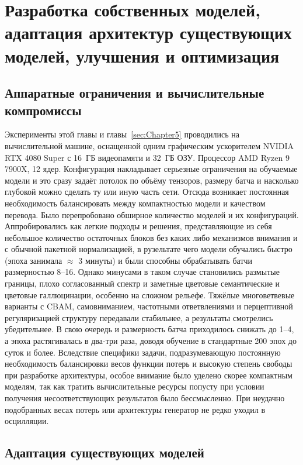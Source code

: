 \chapter{Разработка собственных моделей, адаптация архитектур существующих моделей, улучшения и оптимизация}
\label{sec:Chapter4} 

\section{Аппаратные ограничения и вычислительные компромиссы}
\label{subsec:hardware_constraints}

Эксперименты этой главы и главы~\ref{sec:Chapter5} проводились на вычислительной машине, оснащенной одним графическим ускорителем NVIDIA RTX 4080 Super с 16~ГБ видеопамяти и 32~ГБ ОЗУ.
Процессор AMD Ryzen 9 7900X, 12 ядер.
Конфигурация накладывает серьезные ограничения на обучаемые модели и это сразу задаёт потолок по объёму тензоров, размеру батча и насколько глубокой можно сделать ту или иную часть сети.
Отсюда возникает постоянная необходимость балансировать между компактностью модели и качеством перевода.
Было перепробовано обширное количество моделей и их конфигураций.
Аппробировались как легкие подходы и решения, представляющие из себя небольшое количество остаточных блоков без каких либо механизмов внимания и с обычной пакетной нормализацией, в рузельтате чего модели обучались быстро (эпоха занимала $\approx$ 3 минуты) и были способны обрабатывать батчи размерностью 8--16.
Однако минусами в таком случае становились размытые границы, плохо согласованный спектр и заметные цветовые семантические и цветовые галлюцинации, особенно на сложном рельефе.
Тяжёлые многоветвевые варианты с CBAM, самовниманием, частотными ответвлениями и перцептивной регуляризацией структуру передавали стабильнее, а результаты смотрелись убедительнее.
В свою очередь и размерность батча приходилось снижать до 1--4, а эпоха растягивалась в два-три раза, доводя обучение в стандартные 200 эпох до суток и более.
Вследствие специфики задачи, подразумевающую постоянную необходимость балансировки весов функции потерь и высокую степень свободы при разработке архитектуры, особое внимание было уделено скорее компактным моделям, так как тратить вычислительные ресурсы попусту при условии получения несоответствующих результатов было бессмысленно.
При неудачно подобранных весах потерь или архитектуры генератор не редко уходил в осцилляции.

\section{Адаптация существующих моделей}

